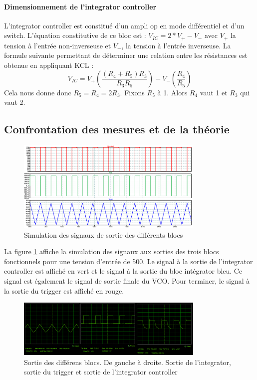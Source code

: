 \paragraph{Dimensionnement de l'integrator controller}
L'integrator controller est constitué d'un ampli op en mode différentiel et d'un switch. L'équation constitutive de ce bloc est : $V_{IC}=2*V_+ - V_-$ avec $V_+$ la tension à l'entrée non-inverseuse et $V_-$, la tension à l'entrée inverseuse. La formule suivante permettant de déterminer une relation entre les résistances est obtenue en appliquant KCL : $$V_{IC}=V_+ \left(\frac{\left(R_4 + R_5\right)R_3}{R_3R_5}\right)-V_-\left(\frac{R_4}{R_5}\right)$$ Cela nous donne donc $R_5 = R_4 = 2R_3$.
Fixons $R_5$ à \unit{1}{\kilo\ohm}. Alors $R_4$ vaut \unit{1}{\kilo\ohm} et $R_3$ qui vaut \unit{2}{\kilo\ohm}.

\subsection{Confrontation  des mesures et de la théorie}
\begin{figure}[ht]
	\centering
	\includegraphics[width=0.8\textwidth]{img/vco_response.png}
	\caption{Simulation des signaux de sortie des différents blocs}
	\label{fig:out_vco_th}
\end{figure}
La figure \ref{fig:out_vco_th} affiche la simulation des signaux aux sorties des trois blocs fonctionnels pour une tension d'entrée de \unit{500}{\milli\volt}. Le signal à la sortie de l'integrator controller est affiché en vert et le signal à la sortie du bloc intégrator bleu. Ce signal est également le signal de sortie finale du VCO. Pour terminer, le signal à la sortie du trigger est affiché en rouge.
\begin{figure}[ht]                                       
	\centering
	\includegraphics[width=0.8\textwidth]{img/vco_real_out.png}
	\caption{Sortie des différens blocs. De gauche à droite. Sortie de l'integrator, sortie du trigger et sortie de l'integrator controller}
	\label{fig:out_vco_real}
\end{figure}
